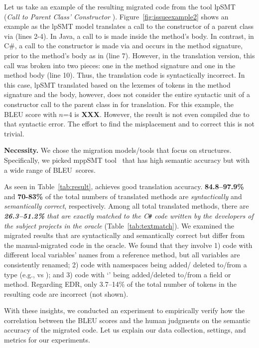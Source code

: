 
Let us take an example of the resulting migrated code from the tool
lpSMT~\cite{fse13-nier} ({\em Call to Parent Class' Constructor
  }). Figure~\ref{fig:issueexample2} shows an example
as the lpSMT model translates a call to the constructor of a parent
class via  (lines 2-4). In Java, a call to  is
made inside the method's body. In contrast, in C\#, a call to the
constructor is made via  and occurs in the method
signature, \ie prior to the method's body as in
 (line 7). However, in the translation
version, this call was broken into two pieces: one in the method
signature  and one in the method body  (line 10). Thus, the translation code is
syntactically incorrect. In this case, lpSMT translated based on the
lexemes of tokens in the method signature and the body, however, does
not consider the entire syntactic unit of a constructor call to the
parent class in  for translation. For this example, the
BLEU score with $n$=4 is {\bf XXX}. However, the result is not even
compiled due to that syntactic error. The effort to find the
misplacement and to correct this is not trivial.

{\bf Necessity.} We chose the migration models/tools that focus on
structures. Specifically, we picked mppSMT tool~\cite{ase15} that has
high semantic accuracy but with a wide range of BLEU~scores.

As seen in Table~\ref{tab:result}, {\tool} achieves good translation
accuracy. {\bf 84.8--97.9\%} and {\bf 70-83\%} of the total numbers of
translated methods are {\em syntactically} and {\em semantically
  correct}, respectively. Among all total translated methods, there
are {\em {\bf 26.3--51.2\%} that are exactly matched to the
  C\texttt{\#} code written by the developers of the subject projects
  in the oracle} (Table~\ref{tab:textmatch}).
%
%
We examined the migrated results that are syntactically and
semantically correct but differ from the manual-migrated code in the
oracle. We found that they involve 1) code with different local
variables' names from a reference method, but all variables are
consistently renamed; 2) code with namespaces being added/ deleted
to/from a type (e.g.,  vs ); and 3) code
with `' being added/deleted to/from a field or method.
Regarding EDR, only 3.7--14\% of the total number of tokens in the
resulting code are incorrect (not shown).

With these insights, we conducted an experiment to empirically verify
how the correlation between the BLEU scores and the human judgments on
the semantic accuracy of the migrated code. Let us explain our data
collection, settings, and metrics for our experiments.
